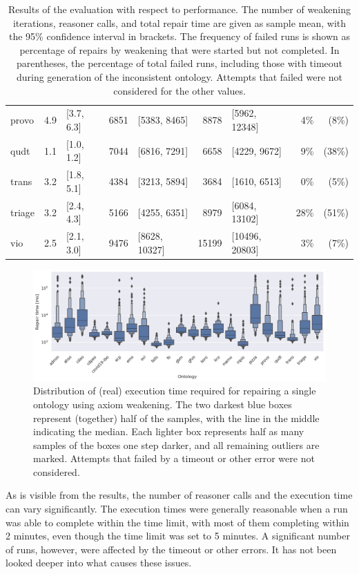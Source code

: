 \begin{table}[ht]
\begin{tabular}{|l|r@{ }lr@{ }lr@{ }lr@{ }r|}
    provo & 4.9 & [3.7, 6.3] & 6851 & [5383, 8465] & 8878 & [5962, 12348] & 4\% & (8\%) \\
    qudt & 1.1 & [1.0, 1.2] & 7044 & [6816, 7291] & 6658 & [4229, 9672] & 9\% & (38\%) \\
    trans & 3.2 & [1.8, 5.1] & 4384 & [3213, 5894] & 3684 & [1610, 6513] & 0\% & (5\%) \\
    triage & 3.2 & [2.4, 4.3] & 5166 & [4255, 6351] & 8979 & [6084, 13102] & 28\% & (51\%) \\
    vio & 2.5 & [2.1, 3.0] & 9476 & [8628, 10327] & 15199 & [10496, 20803] & 3\% & (7\%) \\
    \hline
  \end{tabular}
  \caption{Results of the evaluation with respect to performance. The number of weakening iterations, reasoner calls, and total repair time are given as sample mean, with the 95\% confidence interval in brackets. The frequency of failed runs is shown as percentage of repairs by weakening that were started but not completed. In parentheses, the percentage of total failed runs, including those with timeout during generation of the inconsistent ontology. Attempts that failed were not considered for the other values.}
  \label{table:results-perf}
\end{table}

\begin{figure}[ht]
  \centering
  \includegraphics[width=\textwidth]{resources/time-ontology-violin.png}
  \caption{Distribution of (real) execution time required for repairing a single ontology using axiom weakening. The two darkest blue boxes represent (together) half of the samples, with the line in the middle indicating the median. Each lighter box represents half as many samples of the boxes one step darker, and all remaining outliers are marked. Attempts that failed by a timeout or other error were not considered.}
  \label{fig:results-perf-time}
\end{figure}

As is visible from the results, the number of reasoner calls and the execution time can vary significantly. The execution times were generally reasonable when a run was able to complete within the time limit, with most of them completing within 2 minutes, even though the time limit was set to 5 minutes. A significant number of runs, however, were affected by the timeout or other errors. It has not been looked deeper into what causes these issues.

